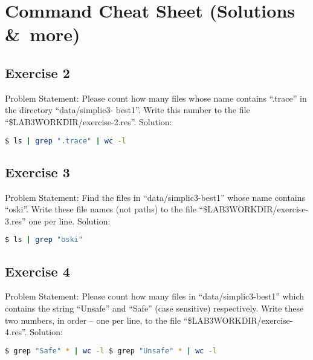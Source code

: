 \documentclass{article}
\begin{document}
\section{Command Cheat Sheet (Solutions \&\ more)}

\subsection{Exercise 2}
\large{Problem Statement: }\normalsize Please count how many files whose name contains ``.trace'' in the directory ``data/simplic3-
best1''. Write this number to the file ``\$LAB3WORKDIR/exercise-2.res''.
\newline\newline
\large{Solution: }\normalsize 
\begin{lstlisting}[language=bash]
$ ls | grep ".trace" | wc -l
\end{lstlisting}

\subsection{Exercise 3}
\large{Problem Statement: }\normalsize Find the files in ``data/simplic3-best1'' whose name contains ``oski''. Write these file names
(not paths) to the file ``\$LAB3WORKDIR/exercise-3.res'' one per line.
\newline\newline
\large{Solution: }\normalsize 
\begin{lstlisting}[language=bash]
$ ls | grep "oski"
\end{lstlisting}

\subsection{Exercise 4}
\large{Problem Statement: }\normalsize Please count how many files in ``data/simplic3-best1'' which contains the string ``Unsafe'' and
``Safe'' (case sensitive) respectively. Write these two numbers, in order – one per line, to the
file ``\$LAB3WORKDIR/exercise-4.res''.
\newline\newline
\large{Solution: }\normalsize 
\begin{lstlisting}[language=bash]
$ grep "Safe" * | wc -l $ grep "Unsafe" * | wc -l
\end{lstlisting}
\end{document}
